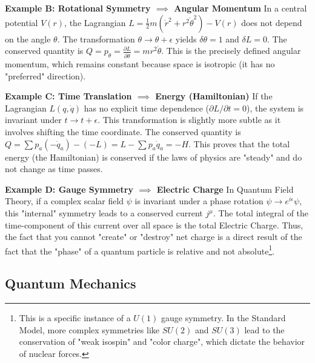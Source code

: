 \textbf{Example B: Rotational Symmetry $\implies$ Angular Momentum}
In a central potential $V(r)$, the Lagrangian $L = \frac{1}{2}m(\dot{r}^2 + r^2\dot{\theta}^2) - V(r)$ does not depend on the angle $\theta$. The transformation $\theta \to \theta + \epsilon$ yields $\delta \theta = 1$ and $\delta L = 0$.
The conserved quantity is $Q = p_\theta = \frac{\partial L}{\partial \dot{\theta}} = mr^2\dot{\theta}$. This is the precisely defined angular momentum, which remains constant because space is isotropic (it has no "preferred" direction).

\textbf{Example C: Time Translation $\implies$ Energy (Hamiltonian)}
If the Lagrangian $L(q, \dot{q})$ has no explicit time dependence ($\partial L / \partial t = 0$), the system is invariant under $t \to t + \epsilon$. This transformation is slightly more subtle as it involves shifting the time coordinate.
The conserved quantity is $Q = \sum p_a (-\dot{q}_a) - (-L) = L - \sum p_a \dot{q}_a = -H$.
This proves that the total energy (the Hamiltonian) is conserved if the laws of physics are "steady" and do not change as time passes.

\textbf{Example D: Gauge Symmetry $\implies$ Electric Charge}
In Quantum Field Theory, if a complex scalar field $\psi$ is invariant under a phase rotation $\psi \to e^{i\epsilon} \psi$, this "internal" symmetry leads to a conserved current $j^\mu$. The total integral of the time-component of this current over all space is the total Electric Charge. Thus, the fact that you cannot "create" or "destroy" net charge is a direct result of the fact that the "phase" of a quantum particle is relative and not absolute\footnote{This is a specific instance of a $U(1)$ gauge symmetry. In the Standard Model, more complex symmetries like $SU(2)$ and $SU(3)$ lead to the conservation of "weak isospin" and "color charge", which dictate the behavior of nuclear forces.}.

\subsection{Quantum Mechanics}

